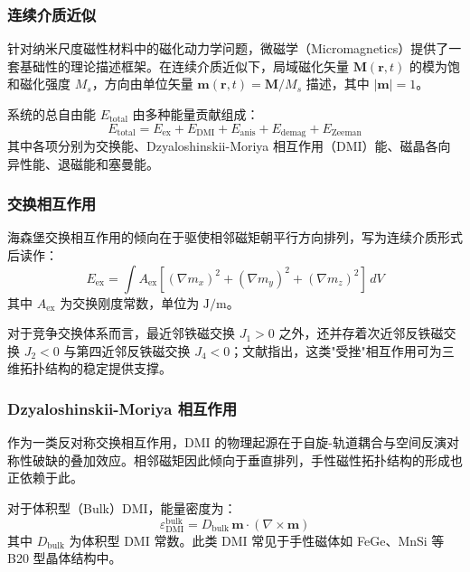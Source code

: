 \documentclass{article}
\begin{document}
\subsubsection*{连续介质近似}
针对纳米尺度磁性材料中的磁化动力学问题，微磁学（Micromagnetics）提供了一套基础性的理论描述框架。在连续介质近似下，局域磁化矢量 $\mathbf{M}(\mathbf{r}, t)$ 的模为饱和磁化强度 $M_s$，方向由单位矢量 $\mathbf{m}(\mathbf{r}, t) = \mathbf{M}/M_s$ 描述，其中 $|\mathbf{m}| = 1$。

系统的总自由能 $E_{\text{total}}$ 由多种能量贡献组成：
\begin{equation}
  E_{\text{total}} = E_{\text{ex}} + E_{\text{DMI}} + E_{\text{anis}} + E_{\text{demag}} + E_{\text{Zeeman}}
  \label{eq:total-energy}
\end{equation}
其中各项分别为交换能、Dzyaloshinskii-Moriya 相互作用（DMI）能、磁晶各向异性能、退磁能和塞曼能。

\subsubsection*{交换相互作用}
海森堡交换相互作用的倾向在于驱使相邻磁矩朝平行方向排列，写为连续介质形式后读作：
\begin{equation}
  E_{\text{ex}} = \int A_{\text{ex}} \left[ (\nabla m_x)^2 + (\nabla m_y)^2 + (\nabla m_z)^2 \right] \, dV
  \label{eq:exchange}
\end{equation}
其中 $A_{\text{ex}}$ 为交换刚度常数，单位为 $\mathrm{J/m}$。

对于竞争交换体系而言，最近邻铁磁交换 $J_1 > 0$ 之外，还并存着次近邻反铁磁交换 $J_2 < 0$ 与第四近邻反铁磁交换 $J_4 < 0$；文献\cite{sallermann2023stability}指出，这类"受挫"相互作用可为三维拓扑结构的稳定提供支撑。

\subsubsection*{Dzyaloshinskii-Moriya 相互作用}
作为一类反对称交换相互作用，DMI 的物理起源在于自旋-轨道耦合与空间反演对称性破缺的叠加效应。相邻磁矩因此倾向于垂直排列，手性磁性拓扑结构的形成也正依赖于此。

对于体积型（Bulk）DMI，能量密度为：
\begin{equation}
  \varepsilon_{\text{DMI}}^{\text{bulk}} = D_{\text{bulk}} \, \mathbf{m} \cdot (\nabla \times \mathbf{m})
  \label{eq:dmi-bulk}
\end{equation}
其中 $D_{\text{bulk}}$ 为体积型 DMI 常数。此类 DMI 常见于手性磁体如 FeGe、MnSi 等 B20 型晶体结构中。
\end{document}
